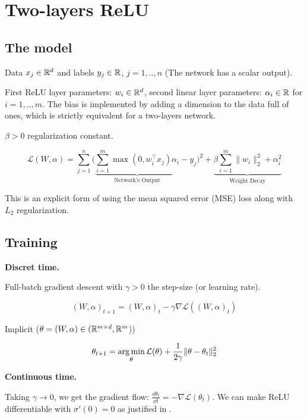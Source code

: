 \section{Two-layers ReLU}
\subsection{The model}

Data $x_j \in \mathbb{R}^d$ and labels $y_j \in \mathbb{R}$, $j=1,..,n$ (The network has a scalar output).

First ReLU layer parameters: $w_i \in \mathbb{R}^d$, second linear layer parameters: $\alpha_i \in \mathbb{R}$ for $i=1,..,m$. The bias is implemented by adding a dimension to the data full of ones, which is strictly equivalent for a two-layers network.

$\beta > 0$ regularization constant.

\begin{equation}
	 \mathcal{L}(W, \alpha) = \sum_{j=1}^n \bigg( \underbrace{\sum_{i=1}^m \max(0, w_i^\top x_j) \alpha_i}_{\text{Network's Output}} - y_j \bigg)^2 + \underbrace{\beta \sum_{i=1}^m \| w_i \|^2_2 + \alpha_i^2}_{\text{Weight Decay}}
\end{equation}

This is an explicit form of using the mean squared error (MSE) loss along with $L_2$ regularization.

\subsection{Training}

\textbf{Discret time.}

Full-batch gradient descent with $\gamma>0$ the step-size (or learning rate).

\begin{equation}
	(W, \alpha)_{t+1} = (W, \alpha)_t - \gamma \nabla \mathcal{L}((W, \alpha)_t)
\end{equation}

Implicit ($\theta = (W, \alpha) \in (\mathbb{R}^{m \times d}, \mathbb{R}^m$))

\begin{equation}
	\theta_{t+1} = \operatorname*{arg\,min}_{\theta} \mathcal{L}(\theta) +\frac{1}{2\gamma} \lVert\theta - \theta_t\rVert_2^2
\end{equation}

\textbf{Continuous time.}

Taking $\gamma \to 0$, we get the gradient flow: $\frac{\dd \theta_t}{\dd t} = - \nabla \mathcal{L}(\theta_t)$. We can make ReLU differentiable with $\sigma'(0)=0$ as justified in \citep{boursierGradientFlowDynamics2022}.

